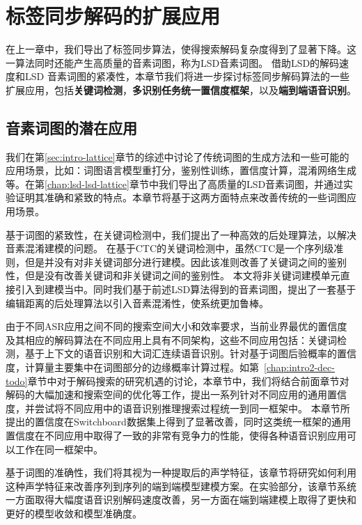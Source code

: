 
\chapter{标签同步解码的扩展应用}
\label{chap:lsd-apply}

在上一章中，我们导出了标签同步算法，使得搜索解码复杂度得到了显著下降。这一算法同时还能产生高质量的音素词图，称为LSD音素词图。
借助LSD的解码速度和LSD 音素词图的紧凑性，本章节我们将进一步探讨标签同步解码算法的一些扩展应用，包括{\bf 关键词检测}，{\bf 多识别任务统一置信度框架}，以及{\bf 端到端语音识别}。

\section{音素词图的潜在应用}
\label{Sec:ctc-lat-intro}


我们在第\ref{sec:intro-lattice}章节的综述中讨论了传统词图的生成方法和一些可能的应用场景，比如：词图语言模型重打分，鉴别性训练，置信度计算，混淆网络生成等。在第\ref{chap:lsd-lsd-lattice}章节中我们导出了高质量的LSD音素词图，并通过实验证明其准确和紧致的特点。本章节将基于这两方面特点来改善传统的一些词图应用场景。

基于词图的紧致性，在关键词检测中，我们提出了一种高效的后处理算法，以解决音素混淆建模的问题。
在基于CTC的关键词检测中，虽然CTC是一个序列级准则，但是并没有对非关键词部分进行建模。因此该准则改善了关键词之间的鉴别性，但是没有改善关键词和非关键词之间的鉴别性。
本文将非关键词建模单元直接引入到建模当中。同时我们基于前述LSD算法得到的音素词图，提出了一套基于编辑距离的后处理算法以引入音素混淆性，使系统更加鲁棒。

由于不同ASR应用之间不同的搜索空间大小和效率要求，当前业界最优的置信度及其相应的解码算法在不同应用上具有不同架构，这些不同应用包括：关键词检测，基于上下文的语音识别和大词汇连续语音识别。针对基于词图后验概率的置信度，计算量主要集中在词图部分的边缘概率计算过程。如第~\ref{chap:intro2-dec-todo}章节中对于解码搜索的研究机遇的讨论，本章节中，我们将结合前面章节对解码的大幅加速和搜索空间的优化等工作，提出一系列针对不同应用的通用置信度，并尝试将不同应用中的语音识别推理搜索过程统一到同一框架中。
本章节所提出的置信度在Switchboard数据集上得到了显著改善，同时这类统一框架的通用置信度在不同应用中取得了一致的非常有竞争力的性能，使得各种语音识别应用可以工作在同一框架中。

基于词图的准确性，我们将其视为一种提取后的声学特征，该章节将研究如何利用这种声学特征来改善序列到序列的端到端模型建模方案。在实验部分，该章节系统一方面取得大幅度语音识别解码速度改善，另一方面在端到端建模上取得了更快和更好的模型收敛和模型准确度。


